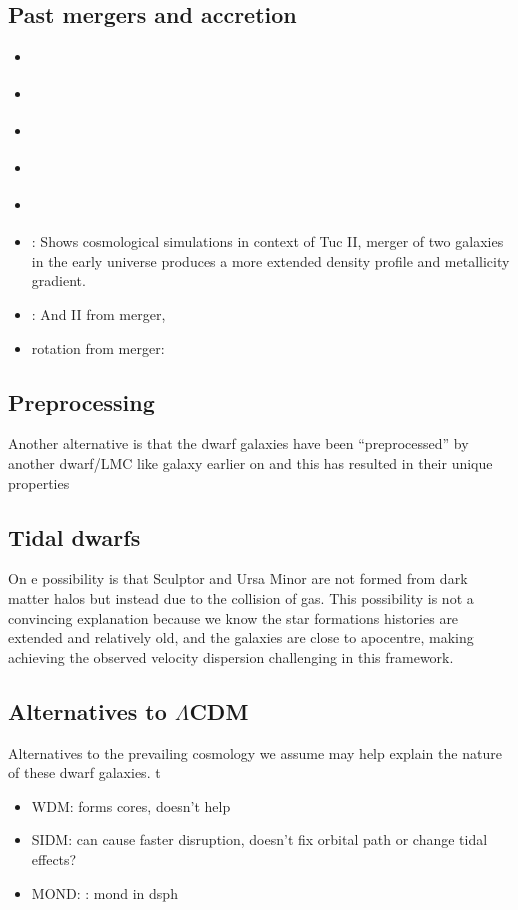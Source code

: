 \subsection{Past mergers and
accretion}\label{past-mergers-and-accretion}

\begin{itemize}
\tightlist
\item
  \citet{deason+2014}
\item
  \citet{deason+2022}
\item
  \citet{ricotti+polisensky+cleland2022}
\item
  \citet{querci+2025}
\item
  \citet{amorisco+evans+vandeven2014}
\item
  \citet{tarumi+yoshida+frebel2021}: Shows cosmological simulations in
  context of Tuc II, merger of two galaxies in the early universe
  produces a more extended density profile and metallicity gradient.
\item
  \citet{lokas+2014}: And II from merger,
\item
  rotation from merger: \citet{cardona-barrero+2021}
\end{itemize}

\subsection{Preprocessing}\label{preprocessing}

Another alternative is that the dwarf galaxies have been
``preprocessed'' by another dwarf/LMC like galaxy earlier on and this
has resulted in their unique properties

\subsection{Tidal dwarfs}\label{tidal-dwarfs}

On e possibility is that Sculptor and Ursa Minor are not formed from
dark matter halos but instead due to the collision of gas. This
possibility is not a convincing explanation because we know the star
formations histories are extended and relatively old, and the galaxies
are close to apocentre, making achieving the observed velocity
dispersion challenging in this framework.

\subsection{\texorpdfstring{Alternatives to
\(\Lambda\)CDM}{Alternatives to \textbackslash LambdaCDM}}\label{alternatives-to-lambdacdm}

Alternatives to the prevailing cosmology we assume may help explain the
nature of these dwarf galaxies. t

\begin{itemize}
\tightlist
\item
  WDM: forms cores, doesn't help
\item
  SIDM: can cause faster disruption, doesn't fix orbital path or change
  tidal effects?
\item
  MOND: \citet{sanchez-salcedo+hernandez2007}: mond in dsph
\end{itemize}
